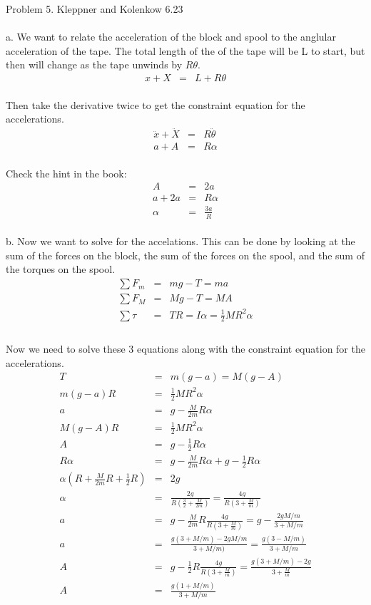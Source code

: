 \documentclass[11pt]{amsart}
\begin{document}
Problem 5. Kleppner and Kolenkow 6.23 \\ \\
a. We want to relate the acceleration of the block and spool to the anglular acceleration of the tape. The total length of the of the tape will be L to start, but then will change as the tape unwinds by $R\theta$. \\
\begin{eqnarray*} 
x+X &=& L+R\theta 
\end{eqnarray*} \\
Then take the derivative twice to get the constraint equation for the accelerations. \\
\begin{eqnarray*} 
\ddot{x}+\ddot{X} &=& R\ddot{\theta} \\
a+A &=& R\alpha 
\end{eqnarray*} \\
Check the hint in the book: \\
\begin{eqnarray*}
A &=& 2a \\
a+2a &=& R\alpha \\
\alpha &=& \frac{3a}{R} 
\end{eqnarray*} \\
b. Now we want to solve for the accelations. This can be done by looking at the sum of the forces on the block, the sum of the forces on the spool, and the sum of the torques on the spool. \\
\begin{eqnarray*}
\sum{F_{m}} &=& mg-T =ma \\
\sum{F_{M}} &=& Mg-T = MA \\
\sum{\tau} &=& TR = I\alpha = \frac{1}{2}MR^{2}\alpha \\
\end{eqnarray*} \\
Now we need to solve these 3 equations along with the constraint equation for the accelerations. \\
\begin{eqnarray*}
T &=& m(g-a) = M(g-A) \\
m(g-a)R &=& \frac{1}{2}MR^{2}\alpha \\
a &=& g- \frac{M}{2m}R\alpha \\
M(g-A)R &=& \frac{1}{2}MR^{2}\alpha \\
A &=& g-\frac{1}{2}R\alpha \\
R\alpha &=&   g- \frac{M}{2m}R\alpha +g-\frac{1}{2}R\alpha \\
\alpha(R+\frac{M}{2m}R+\frac{1}{2}R) &=& 2g \\
\alpha &=& \frac{2g}{R(\frac{3}{2}+\frac{M}{2m})} = \frac{4g}{R(3+\frac{M}{m})} \\
a &=& g-\frac{M}{2m}R\frac{4g}{R(3+\frac{M}{m})} =g-\frac{2gM/m}{3+M/m} \\
a &=& \frac{g(3+M/m)-2gM/m}{3+M/m)} = \frac{g(3-M/m)}{3+M/m} \\
A &=& g-\frac{1}{2}R\frac{4g}{R(3+\frac{M}{m})} = \frac{g(3+M/m)-2g}{3+\frac{M}{m}} \\
A &=& \frac{g(1+M/m)}{3+M/m} 
\end{eqnarray*} \\
\end{document}
